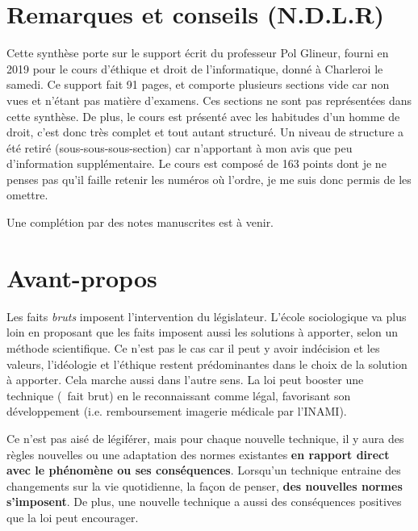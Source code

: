 \documentclass[fleqn,letterpaper, 12pt]{article}
\begin{document}
	
	
	
	
	
	
	\section{Remarques et conseils (N.D.L.R)}
	
	Cette synthèse porte sur le support écrit du professeur Pol Glineur, fourni en 2019 pour le cours d'éthique et droit de l'informatique, donné à Charleroi le samedi. Ce support fait 91 pages, et comporte plusieurs sections vide car non vues et n'étant pas matière d'examens. Ces sections ne sont pas représentées dans cette synthèse. De plus, le cours est présenté avec les habitudes d'un homme de droit, c'est donc très complet et tout autant structuré. Un niveau de structure a été retiré (sous-sous-sous-section) car n'apportant à mon avis que peu d'information supplémentaire. Le cours est composé de 163 points dont je ne penses pas qu'il faille retenir les numéros où l'ordre, je me suis donc permis de les omettre.
	
	
	Une complétion par des notes manuscrites est à venir.
	
	
	
	
	
	\section{Avant-propos}
	
	Les faits \emph{bruts} imposent l'intervention du législateur. L'école sociologique va plus loin en proposant que les faits imposent aussi les solutions à apporter, selon un méthode scientifique. Ce n'est pas le cas car il peut y avoir indécision et les valeurs, l'idéologie et l'éthique restent prédominantes dans le choix de la solution à apporter. Cela marche aussi dans l'autre sens. La loi peut booster une technique (~fait brut) en le reconnaissant comme légal, favorisant son développement (i.e. remboursement imagerie médicale par l'INAMI).
	
	Ce n'est pas aisé de légiférer, mais pour chaque nouvelle technique, il y aura des règles nouvelles ou une adaptation des normes existantes \textbf{en rapport direct avec le phénomène ou ses conséquences}. Lorsqu'un technique entraine des changements sur la vie quotidienne, la façon de penser, \textbf{des nouvelles normes s'imposent}. De plus, une nouvelle technique a aussi des conséquences positives que la loi peut encourager.
	
\end{document}
